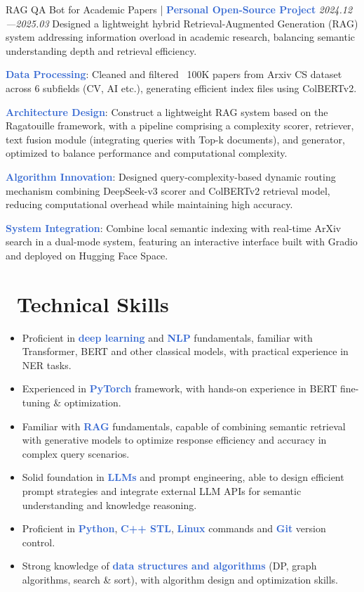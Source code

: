\documentclass{resume}
\newcommand{\highlight}[1]{\textcolor{highlight}{\textbf{#1}}}
\begin{document}
\project
{RAG QA Bot for Academic Papers | \highlight{Personal Open-Source Project}}
{\textit{2024.12—2025.03}}
{
  Designed a lightweight hybrid Retrieval-Augmented Generation (RAG) system addressing information overload in academic research, balancing semantic understanding depth and retrieval efficiency.
}{
  \item \highlight{Data Processing}: Cleaned and filtered ~100K papers from Arxiv CS dataset across 6 subfields (CV, AI etc.), generating efficient index files using ColBERTv2.
  \item \highlight{Architecture Design}: Construct a lightweight RAG system based on the Ragatouille framework, with a pipeline comprising a complexity scorer, retriever, text fusion module (integrating queries with Top-k documents), and generator, optimized to balance performance and computational complexity.
  \item \highlight{Algorithm Innovation}: Designed query-complexity-based dynamic routing mechanism combining DeepSeek-v3 scorer and ColBERTv2 retrieval model, reducing computational overhead while maintaining high accuracy.
  \item \highlight{System Integration}: Combine local semantic indexing with real-time ArXiv search in a dual-mode system, featuring an interactive interface built with Gradio and deployed on Hugging Face Space.
}

\section{\faCogs~Technical Skills}
\begin{itemize}[leftmargin=1.2em]
  \item Proficient in \highlight{deep learning} and \highlight{NLP} fundamentals, familiar with Transformer, BERT and other classical models, with practical experience in NER tasks. 
  \item Experienced in \highlight{PyTorch} framework, with hands-on experience in BERT fine-tuning \& optimization.
  \item Familiar with \highlight{RAG} fundamentals, capable of combining semantic retrieval with generative models to optimize response efficiency and accuracy in complex query scenarios.
  \item Solid foundation in \highlight{LLMs} and prompt engineering, able to design efficient prompt strategies and integrate external LLM APIs for semantic understanding and knowledge reasoning.
  \item Proficient in \highlight{Python}, \highlight{C++ STL}, \highlight{Linux} commands and \highlight{Git} version control.
  \item Strong knowledge of \highlight{data structures and algorithms} (DP, graph algorithms, search \& sort), with algorithm design and optimization skills.
\end{itemize}
\end{document}
